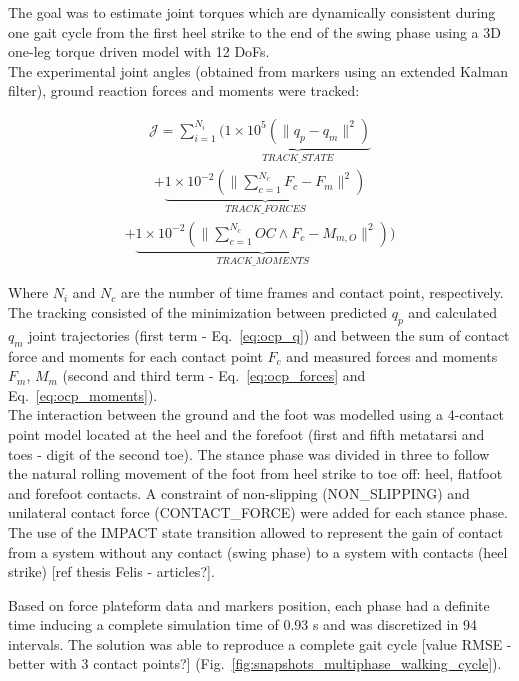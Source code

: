 
The goal was to estimate joint torques which are dynamically consistent during one gait cycle from the first heel strike to the end of the swing phase using a 3D one-leg torque driven model with 12 DoFs.  \\

The experimental joint angles (obtained from markers using an extended Kalman filter), ground reaction forces and moments were tracked:

\begin{eqnarray}
\label{eq:ocp_q}
\mathcal{J} = \sum_{i=1}^{N_i}\Bigg(\underbrace{1\times 10^{5}(\|q_p - q_m\|^{2})}_{TRACK\_STATE}
\label{eq:ocp_forces}
\end{eqnarray}
\begin{eqnarray}
+ \underbrace{1\times 10^{-2}(\|\sum_{c=1}^{N_c}F_c - F_m\|^{2})}_{TRACK\_FORCES}
\end{eqnarray}
\begin{eqnarray}
\label{eq:ocp_moments}
+ \underbrace{1\times 10^{-2}(\|\sum_{c=1}^{N_c}OC\wedge F_c - M_{m,O}\|^{2})}_{TRACK\_MOMENTS}\bigg) 
\end{eqnarray}

Where $N_i$ and $N_c$ are the number of time frames and contact point, respectively. The tracking consisted of the minimization between predicted $q_p$ and calculated $q_m$ joint trajectories (first term - Eq.~\ref{eq:ocp_q}) and between the sum of contact force and moments for each contact point $F_c$ and measured forces and moments $F_m$, $M_m$ (second and third term - Eq.~\ref{eq:ocp_forces} and Eq.~\ref{eq:ocp_moments}). \\


The interaction between the ground and the foot was modelled using a 4-contact point model located at the heel and the forefoot (first and fifth metatarsi and toes - digit of the second toe). The stance phase was divided in three to follow the natural rolling movement of the foot from heel strike to toe off: heel, flatfoot and forefoot contacts. A constraint of non-slipping (NON\_SLIPPING) and unilateral contact force (CONTACT\_FORCE) were added for each stance phase. The use of the IMPACT state transition allowed to represent the gain of contact from a system without any contact (swing phase) to a system with contacts (heel strike) [ref thesis Felis - articles?].  


Based on force plateform data and markers position, each phase had a definite time inducing a complete simulation time of 0.93 s and was discretized in 94 intervals. The solution was able to reproduce a complete gait cycle [value RMSE - better with 3 contact points?] (Fig.~\ref{fig:snapshots_multiphase_walking_cycle}). 

